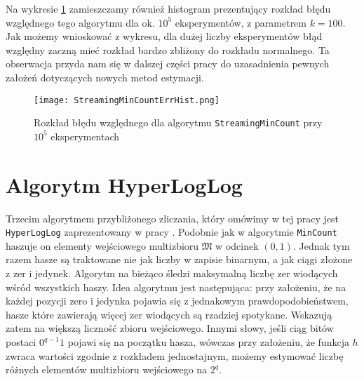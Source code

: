 Na wykresie \ref{fig:str_mincount_hist} zamieszczamy również histogram prezentujący rozkład błędu względnego tego algorytmu dla ok. $10^5$ eksperymentów, z parametrem $k=100$. Jak możemy wnioskować z wykresu, dla dużej liczby eksperymentów błąd względny zaczną mieć rozkład bardzo zbliżony do rozkładu normalnego. Ta obserwacja przyda nam się w dalszej części pracy do uzasadnienia pewnych założeń dotyczących nowych metod estymacji.

\begin{figure}[H]
	\texttt{[image: StreamingMinCountErrHist.png]}
	\centering
	\caption{Rozkład błędu względnego dla algorytmu \texttt{StreamingMinCount} przy $10^5$ eksperymentach}
	\label{fig:str_mincount_hist}
\end{figure}

\section{Algorytm HyperLogLog}
\label{hll}

Trzecim algorytmem przybliżonego zliczania, który omówimy w tej pracy jest \texttt{HyperLogLog} zaprezentowany w pracy \cite{hll}. Podobnie jak w algorytmie \texttt{MinCount}  haszuje on elementy wejściowego  multizbioru $\mathfrak{M}$ w odcinek $(0,1)$. Jednak tym razem hasze są traktowane nie jak liczby w zapisie binarnym, a jak ciągi złożone z zer i jedynek. Algorytm na bieżąco śledzi maksymalną liczbę zer wiodących wśród wszystkich haszy. Idea algorytmu jest następująca: przy założeniu, że na każdej pozycji zero i jedynka pojawia się z jednakowym prawdopodobieństwem,  hasze które zawierają więcej zer wiodących są rzadziej spotykane. Wskazują zatem na większą liczność zbioru wejściowego. Innymi słowy, jeśli ciąg bitów postaci $0^{q-1}1$ pojawi się na początku hasza, wówczas przy założeniu, że funkcja $h$ zwraca wartości zgodnie z rozkładem jednostajnym, możemy estymować liczbę różnych elementów multizbioru wejściowego na $2^{q}$.

